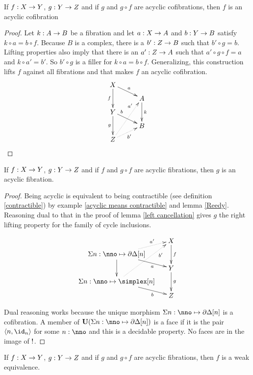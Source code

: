 \documentclass[csh.tex]{subfiles}
\begin{document}
\begin{lemma} If $f: X\to Y$, $g: Y\to Z$ and if $g$ and $g\circ f$ are acyclic cofibrations, then $f$ is an acyclic cofibration \label{left cancellation} \end{lemma}

\begin{proof} Let $k: A\to B$ be a fibration and let $a: X\to A$ and $b: Y\to B$ satisfy $k\circ a=b\circ f$. Because $B$ is a complex, there is a $b': Z\to B$ such that $b'\circ g = b$. Lifting properties also imply that there is an $a': Z\to A$ such that $a'\circ g\circ f = a$ and $k\circ a'= b'$. So $b'\circ g$ is a filler for $k\circ a=b\circ f$. Generalizing, this construction lifts $f$ against all fibrations and that makes $f$ an acyclic cofibration.
\[\xy
(0,28)*+{X}="x",(14\halfrootthree,21)*+{A}="a",(0,14)*+{Y}="y",(14\halfrootthree,7)*+{B}="b",(0,0)*+{Z}="z"
\ar^a "x";"a" \ar_f "x";"y" \ar^k "a";"b" \ar^(.25)b "y";"b" \ar_g "y";"z"
\ar@{.>}_{b'} "z";"b" \ar@{.>}^(.75){a'} "z";"a"
\endxy\]
\end{proof}

\begin{lemma} If $f: X\to Y$, $g: Y\to Z$ and if $f$ and $g\circ f$ are acyclic fibrations, then $g$ is an acyclic fibration. \label{right cancellation}\end{lemma}

\begin{proof} Being acyclic is equivalent to being contractible (see definition \ref{contractible}) by example \ref{acyclic means contractible} and lemma \ref{Reedy}. Reasoning dual to that in the proof of lemma \ref{left cancellation} gives $g$ the right lifting property for the family of cycle inclusions.

\[\xy
(28,28)*+{X}="x", (0,21)*+{\coproduct{n\of\nno}\cycle[n]}="v", (28,14)*+{Y}="y", (0,7)*+{\coproduct{n\of\nno}\simplex[n]}="w", (28,0)*+{Z}="z"
\ar@{.>}^(.67){a'} "v";"x" \ar_(.67)a "v";"y" \ar "v";"w"
\ar@{.>}_(.75){b'} "w";"x" \ar_(.67)b "w";"z"
\ar^f "x";"y" \ar^g "y";"z"
\endxy\]

Dual reasoning works because the unique morphism $\coproduct{n\of\nno}\cycle[n]$ is a cofibration. A member of $\base(\coproduct{n\of\nno}\cycle[n])$ is a face if it is the pair $\tuplet{n,\id_n}$ for some $n\of\nno$ and this is a decidable property. No faces are in the image of $!$.
\end{proof}

\begin{lemma} If $f: X\to Y$, $g: Y\to Z$ and if $g$ and $g\circ f$ are acyclic fibrations, then $f$ is a weak equivalence.\label{shared retract 2} \end{lemma}
\end{document}

